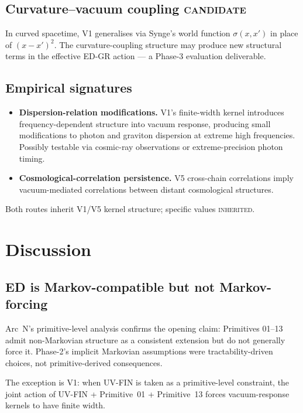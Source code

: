 \documentclass[11pt,a4paper]{article}
\begin{document}
\subsection{Curvature--vacuum coupling \textsc{candidate}}

In curved spacetime, V1 generalises via Synge's world function $\sigma(x, x')$ in place of $(x - x')^2$. The curvature-coupling structure may produce new structural terms in the effective ED-GR action --- a Phase-3 evaluation deliverable.

\subsection{Empirical signatures}

\begin{itemize}
  \item \textbf{Dispersion-relation modifications.} V1's finite-width kernel introduces frequency-dependent structure into vacuum response, producing small modifications to photon and graviton dispersion at extreme high frequencies. Possibly testable via cosmic-ray observations or extreme-precision photon timing.
  \item \textbf{Cosmological-correlation persistence.} V5 cross-chain correlations imply vacuum-mediated correlations between distant cosmological structures.
\end{itemize}

Both routes inherit V1/V5 kernel structure; specific values \textsc{inherited}.

\section{Discussion}

\subsection{ED is Markov-compatible but not Markov-forcing}

Arc~N's primitive-level analysis confirms the opening claim: Primitives 01--13 admit non-Markovian structure as a consistent extension but do not generally force it. Phase-2's implicit Markovian assumptions were tractability-driven choices, not primitive-derived consequences.

The exception is V1: when UV-FIN is taken as a primitive-level constraint, the joint action of UV-FIN + Primitive~01 + Primitive~13 forces vacuum-response kernels to have finite width.
\end{document}
